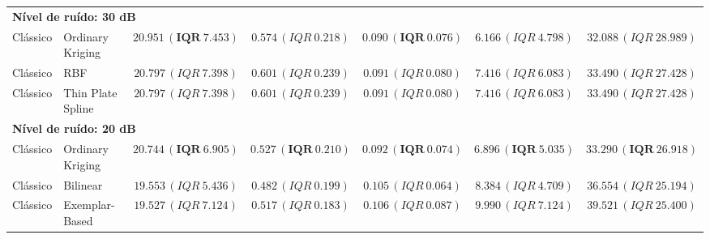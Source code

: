 \begin{table}[htbp]
{\begin{tabular}{llccccc}
\midrule
\multicolumn{7}{l}{\textbf{Nível de ruído: 30 dB}} \\
Clássico & Ordinary Kriging & $\mathbf{20.951\,(IQR\ 7.453)}$ & $0.574\,(IQR\ 0.218)$ & $\mathbf{0.090\,(IQR\ 0.076)}$ & $6.166\,(IQR\ 4.798)$ & $32.088\,(IQR\ 28.989)$ \\
Clássico & RBF & $20.797\,(IQR\ 7.398)$ & $0.601\,(IQR\ 0.239)$ & $0.091\,(IQR\ 0.080)$ & $7.416\,(IQR\ 6.083)$ & $33.490\,(IQR\ 27.428)$ \\
Clássico & Thin Plate Spline & $20.797\,(IQR\ 7.398)$ & $0.601\,(IQR\ 0.239)$ & $0.091\,(IQR\ 0.080)$ & $7.416\,(IQR\ 6.083)$ & $33.490\,(IQR\ 27.428)$ \\
\midrule
\multicolumn{7}{l}{\textbf{Nível de ruído: 20 dB}} \\
Clássico & Ordinary Kriging & $\mathbf{20.744\,(IQR\ 6.905)}$ & $\mathbf{0.527\,(IQR\ 0.210)}$ & $\mathbf{0.092\,(IQR\ 0.074)}$ & $\mathbf{6.896\,(IQR\ 5.035)}$ & $\mathbf{33.290\,(IQR\ 26.918)}$ \\
Clássico & Bilinear & $19.553\,(IQR\ 5.436)$ & $0.482\,(IQR\ 0.199)$ & $0.105\,(IQR\ 0.064)$ & $8.384\,(IQR\ 4.709)$ & $36.554\,(IQR\ 25.194)$ \\
Clássico & Exemplar-Based & $19.527\,(IQR\ 7.124)$ & $0.517\,(IQR\ 0.183)$ & $0.106\,(IQR\ 0.087)$ & $9.990\,(IQR\ 7.124)$ & $39.521\,(IQR\ 25.400)$ \\
\bottomrule
\end{tabular}
}
\end{table}
